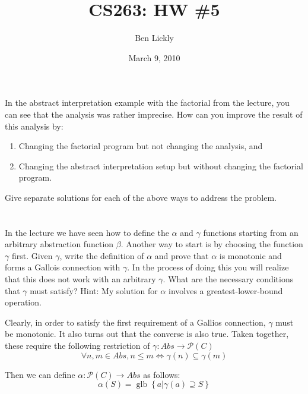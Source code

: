 \documentclass{article}
\title{CS263: HW \#5}
\author{Ben Lickly}
\date{March 9, 2010}
\newcommand{\problem}[1]
{\subsubsection*{} %
\vspace{-16pt} \section{} \vspace{-22pt} \qquad
#1%
\bigskip \bigskip
}
\newcommand{\powerset}{\mathcal{P}}
\newcommand{\glb}{\operatorname{glb}}
\begin{document}
\maketitle

\problem{In the abstract interpretation example with the factorial from
the lecture, you can see that the analysis was rather imprecise. How can you
improve the result of this analysis by:
\begin{enumerate}
  \item Changing the factorial program but not changing the analysis, and
  \item Changing the abstract interpretation setup but without changing the
factorial program.
\end{enumerate}
Give separate solutions for each of the above ways to address the problem.
}

\problem{In the lecture we have seen how to define the $\alpha$ and $\gamma$
functions starting from an arbitrary abstraction function $\beta$. Another way to
start is by choosing the function $\gamma$ first. Given $\gamma$, write the
definition of $\alpha$ and prove that $\alpha$ is monotonic and forms a Gallois
connection with $\gamma$. In the process of doing this you will realize that this
does not work with an arbitrary $\gamma$. What are the necessary conditions that
$\gamma$ must satisfy? Hint: My solution for $\alpha$ involves a
greatest-lower-bound operation.
}

Clearly, in order to satisfy the first requirement of a Gallios connection,
$\gamma$ must be monotonic.  It also turns out that the converse is also true. 
Taken together, these require the following restriction of
$\gamma : Abs \to \powerset(C)$
\[
\forall n, m \in Abs, n \le m \iff \gamma(n) \subseteq \gamma(m)
\]

Then we can define $\alpha : \powerset(C) \to Abs$ as follows:
\[
\alpha(S) =  \glb \left\{ a | \gamma(a) \supseteq S \right\}
\]
\end{document}
